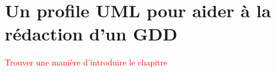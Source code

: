 \chapter{Un profile UML pour aider à la rédaction d'un GDD}

\textcolor{red}{Trouver une manière d'introduire le chapitre}
\begin{comment}
\chapter{Un langage de modélisation pour l'établissement d'un Game Design Document}

\section{Le concept}
\subsection{Définition}
\subsubsection{Quoi ?}
Un langage permettant de modéliser et stocker des idées lors des phases de Breakthrough et de Conception d'un projet de jeu vidéo. La modélisation peut être graphique et/ou textuelle avec application des modifications en parallèle. \\
Les informations peuvent contenir tout le nécessaire pour exprimer les idées (textes, informations numériques, chemins de fichiers...). Les champs peuvent être personalisables pour permettre de la souplesse aux utilisateurs.

\subsubsection{Pour quoi faire ?}
\paragraph{Des outils de modélisation existent pour tous les domaines reliés au développement de logiciels. Ils sont souvent spécifiques à un corps de métier afin de pouvoir proposer un maximum de fonctionnalités spécifiques sans devenir trop compliqué et en utilisant un vocabulaire précis qui correspond au corps de métier concerné.}

\paragraph{Il y a peu ou pas de langages de modélisation plus généraux pour des domaines multi-métiers. Le but est de pouvoir modéliser la réflexion créative en fournissant un élément visuel permettant de mind-mapper les idées, les stocker et les réutiliser. \\
Il faut que la modélisation soit assez souple pour pouvoir répondre aux besoins de chacun des corps de métier d'où le fait que les éléments et attributs peuvent avoir des identifiants spécifiques définis librement par l'utilisateur.}


\end{comment}
